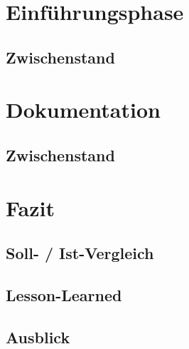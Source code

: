 \documentclass[12pt, xcolor=dvipsnames]{scrartcl}
\begin{document}
\section{Einführungsphase}

\subsection{Zwischenstand}


\section{Dokumentation}

\subsection{Zwischenstand}

\section{Fazit}

\subsection{Soll- / Ist-Vergleich}

\subsection{Lesson-Learned}

\subsection{Ausblick}

\newpage


\end{document}
